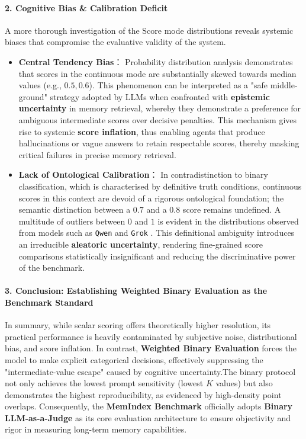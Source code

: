 \paragraph{2. Cognitive Bias \& Calibration Deficit}
A more thorough investigation of the Score mode distributions reveals systemic biases that compromise the evaluative validity of the system.
\begin{itemize}
\item \textbf{Central Tendency Bias}： Probability distribution analysis demonstrates that scores in the continuous mode are substantially skewed towards median values (e.g., $0.5, 0.6$). This phenomenon can be interpreted as a "safe middle-ground" strategy adopted by LLMs when confronted with \textbf{epistemic uncertainty} in memory retrieval, whereby they demonstrate a preference for ambiguous intermediate scores over decisive penalties. This mechanism gives rise to systemic \textbf{score inflation}, thus enabling agents that produce hallucinations or vague answers to retain respectable scores, thereby masking critical failures in precise memory retrieval.
\item \textbf{Lack of Ontological Calibration}： In contradistinction to binary classification, which is characterised by definitive truth conditions, continuous scores in this context are devoid of a rigorous ontological foundation; the semantic distinction between a $0.7$ and a $0.8$ score remains undefined. A multitude of outliers between $0$ and $1$ is evident in the distributions observed from models such as \texttt{Qwen} and \texttt{Grok} . This definitional ambiguity introduces an irreducible \textbf{aleatoric uncertainty}, rendering fine-grained score comparisons statistically insignificant and reducing the discriminative power of the benchmark.
\end{itemize}

\paragraph{3. Conclusion: Establishing Weighted Binary Evaluation as the Benchmark Standard}

In summary, while scalar scoring offers theoretically higher resolution, its practical performance is heavily contaminated by subjective noise, distributional bias, and score inflation. In contrast, \textbf{Weighted Binary Evaluation} forces the model to make explicit categorical decisions, effectively suppressing the "intermediate-value escape" caused by cognitive uncertainty.The binary protocol not only achieves the lowest prompt sensitivity (lowest $K$ values) but also demonstrates the highest reproducibility, as evidenced by high-density point overlaps. Consequently, the \textbf{MemIndex Benchmark} officially adopts \textbf{Binary LLM-as-a-Judge} as its core evaluation architecture to ensure objectivity and rigor in measuring long-term memory capabilities.
